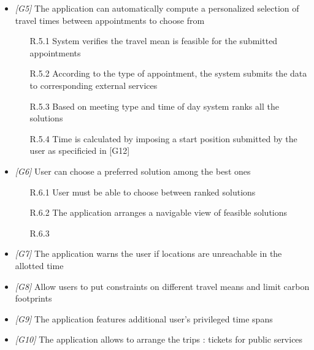 \begin{itemize}
\begin{itemize}
                  \end{itemize}

\item \textit{[G5]} The application can automatically compute a personalized selection of travel times between appointments to choose from

                  \begin{itemize}
                        \item [R.5.1] System verifies the travel mean is feasible for the submitted appointments
                        \item [R.5.2] According to the type of appointment, the system submits the data to corresponding external services
                        \item [R.5.3] Based on meeting type and time of day system ranks all the solutions
                        \item [R.5.4] Time is calculated by imposing a start position submitted by the user as specificied in [G12]
                  \end{itemize}
                  
\item \textit{[G6]} User can choose a preferred solution among the best ones 

                   \begin{itemize}
                        \item [R.6.1] User must be able to choose between ranked solutions
                        \item [R.6.2] The application arranges a navigable view of feasible solutions
                        \item [R.6.3] 
                  \end{itemize}
                  
\item \textit{[G7]} The application warns the user if locations are unreachable in the allotted time 

\item \textit{[G8]} Allow users to put constraints on different travel means and limit carbon footprints

\item \textit{[G9]} The application features additional user’s privileged time spans 

\item \textit{[G10]} The application allows to arrange the trips : tickets for public services


\end{itemize}
